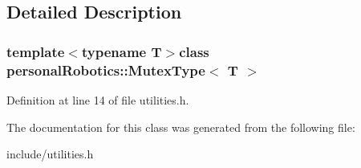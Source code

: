 \subsection{Detailed Description}
\subsubsection*{template$<$typename T$>$class personal\+Robotics\+::\+Mutex\+Type$<$ T $>$}



Definition at line 14 of file utilities.\+h.



The documentation for this class was generated from the following file\+:\begin{DoxyCompactItemize}
\item 
include/utilities.\+h\end{DoxyCompactItemize}

